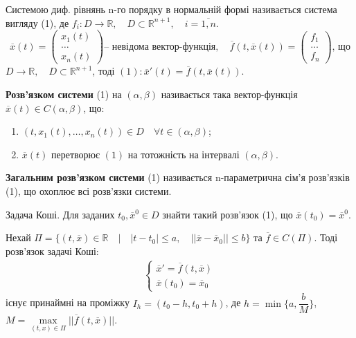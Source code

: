 \documentclass[14pt,a4paper]{scrartcl}
\theoremstyle{definition}
\theoremstyle{remark}
\theoremstyle{definition}
\theoremstyle{definition}
\begin{document}
 Системою диф. рівнянь n-го порядку в нормальній формі називається система вигляду (1), де $ f_i : D \to \mathbb{R}, \quad D \subset \mathbb{R}^{n+1 }, \quad i = \overline{1, n}$.
\look
\[
      \overline{x}(t) = \left(\begin{array}{l}
      x_1(t)    \\
      \dots     \\
      x_n(t)
      \end{array}\right) \text{-- невідома вектор-функція}, \quad
      \overline{f}(t, \overline{x}(t)) = \left(\begin{array}{l}
      f_1     \\
      \dots  \\
      f_n
      \end{array}\right) \text{, що}
\]
$D \rightarrow \mathbb{R}, \quad D \subset \mathbb{R}^{n+1}$, тоді $(1): \overline{x}'(t) = \overline{f}(t, \overline{x}(t))$.


\def\rect{\textbf{П}}
\bd
\textbf{Розв'язком системи} (1) на $(\alpha , \beta)$ називається така вектор-функція $\overline{x} (t) \in C(\alpha , \beta)$, що:
\begin{enumerate}
  \item $(t, x_1(t), \dots, x_n(t)) \in D \quad \forall t \in (\alpha, \beta)$;
  \item $\overline{x}(t)$  перетворює $(1)$ на тотожність на інтервалі $(\alpha, \beta)$.
\end{enumerate}

\textbf{Загальним розв'язком системи}  (1) називається n-параметрична сім'я розв'язків (1), що охоплює всі розв'язки системи.
\ed

Задача Коші. Для заданих $t_0, \overline{x}^{0} \in D$ знайти такий розв'язок (1), що $\overline{x} (t_0) = \overline{x}^{0}$.

\begin{boxteo}
Нехай $\Pi = \{(t, \overline{x}) \in \mathbb{R} \quad \big| \quad |t-t_0| \leq a, \quad ||\overline{x} - \overline{x}_0|| \leq b \}$ та $\overline{f} \in C(\Pi)$. Тоді розв'язок задачі Коші:
\begin{gather*}
  \begin{cases}
    \overline{x}' = \overline{f}(t, \overline{x}) \\
    \overline{x}(t_0) = \overline{x}_0
  \end{cases}
\end{gather*}
існує принаймні на проміжку $I_h = (t_0 - h, t_0 + h)$, де $h = \min\{{a, \dfrac{b}{M}}\}$, \\ $M = \max\limits_{(t, x) \in \Pi} {||\overline{f}(t, \overline{x})||}$.
\end{boxteo}
\end{document}
